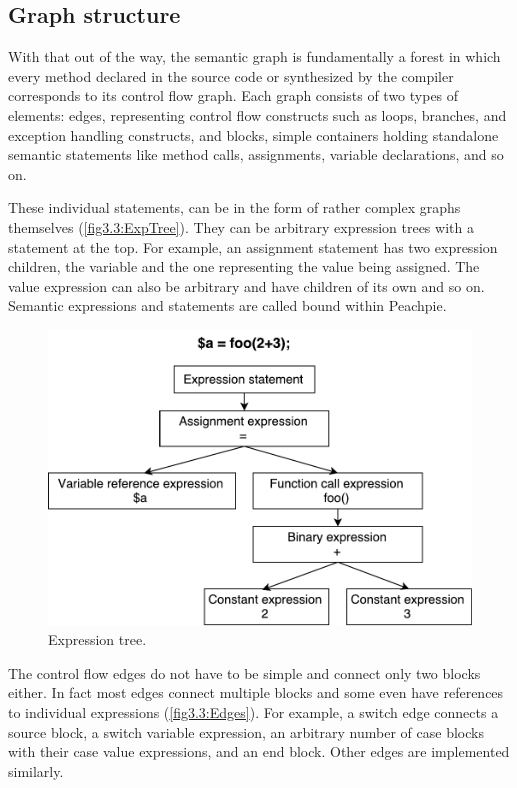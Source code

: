 \subsection{Graph structure}

With that out of the way, the semantic graph is fundamentally a forest in which every method declared in the source code or synthesized by the compiler corresponds to its control flow graph. Each graph consists of two types of elements: edges, representing control flow constructs such as loops, branches, and exception handling constructs, and blocks, simple containers holding standalone semantic statements like method calls, assignments, variable declarations, and so on. 

These individual statements, can be in the form of rather complex graphs themselves (\autoref{fig3.3:ExpTree}). They can be arbitrary expression trees with a statement at the top. For example, an assignment statement has two expression children, the variable and the one representing the value being assigned. The value expression can also be arbitrary and have children of its own and so on. Semantic expressions and statements are called bound within Peachpie.

\begin{figure}[h]
	\centering	
	\includegraphics[scale=0.75]{../img/3_3_exprstatements}	
	\caption{Expression tree.}
	\label{fig3.3:ExpTree}
\end{figure}

The control flow edges do not have to be simple and connect only two blocks either. In fact most edges connect multiple blocks and some even have references to individual expressions (\autoref{fig3.3:Edges}). For example, a switch edge connects a source block, a switch variable expression, an arbitrary number of case blocks with their case value expressions, and an end block. Other edges are implemented similarly.

